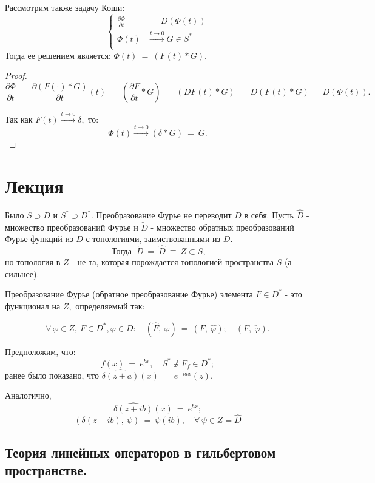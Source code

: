 \documentclass[a4paper]{article}
\newcommand{\ff} {\varphi}
\newcommand{\w}{\widehat}
\begin{document}
\begin{theorem}
Рассмотрим  также задачу Коши:
$$
\left\{
\begin{aligned}
\frac{\partial \Phi}{\partial t} \ &= \ D(\Phi(t))\\
\Phi (t) &\stackrel{t \rightarrow 0}{\rightarrow} G \in S^{*}\\
\end{aligned}
\right.
$$
Тогда ее решением является: $\Phi(t)\ = \ (F(t)*G).$
\end{theorem}

\begin{proof}
$$
\frac{\partial \Phi}{\partial t} \ = \ \frac{\partial (F(\cdot)
* G)}{\partial t} (t) \ = \ \left( \frac{\partial F}{\partial t} * G
\right)\ = \ (DF(t) * G)\ = \ D(F(t) * G)\ = D(\Phi(t)).
$$

Так как $F(t) \stackrel{t \rightarrow 0}{\rightarrow} \delta,$ то:
$$
\Phi(t) \stackrel{t \rightarrow 0}{\rightarrow} (\delta * G )\ = \
G.
$$
\end{proof}

\section{Лекция}

\begin{note}
Было $S\supset D$ и $S^{*} \supset D^{*}.$ Преобразование Фурье не
переводит $D$ в себя. Пусть $\w{D}$ - множество преобразований
Фурье и $\check{D}$ - множество обратных преобразований Фурье
функций из $D$ с топологиями, заимствованными из $D.$
$$
\mbox{ Тогда }\ \check{D}\  =\  \w{D}\ \equiv \ Z\subset S,
$$
но топология в $Z$ - не та, которая порождается топологией
пространства $S$ (а сильнее).

Преобразование Фурье (обратное преобразование Фурье) элемента
$F\in D^{*}$ - это функционал на $Z,$ определяемый так:

$$\forall \, \ff \in Z, \ F\in D^{*}, \ff\in D: \quad
(\w{F}, \ \ff)\ = \ (F, \ \w{\ff}); \quad (F, \  \check{\ff}).
$$


Предположим, что:
$$
f(x)\ = \ e^{bx}, \quad S^{*} \not\ni F_{f} \in D^{*};
$$
ранее было показано, что $\w{\delta (z+a)} (x) \ = \ e^{-
iax}(z).$

Аналогично,
$$
\w{\delta (z + ib)} (x) \ = \ e^{bx};
$$
$$
(\delta (z - ib), \ \psi)\ = \ \psi(ib), \quad \forall \, \psi\in
Z = \w{D}
$$
\end{note}

\subsection{Теория линейных операторов в гильбертовом пространстве.}
\end{document}
